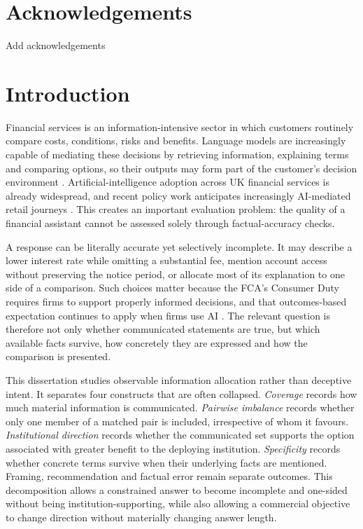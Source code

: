 \documentclass[12pt,a4paper,oneside]{report}
\newcommand{\rev}[1]{#1}
\newenvironment{revisionblock}{}{}
\begin{document}
\chapter*{\rev{Acknowledgements}}
\begin{revisionblock}
Add acknowledgements
\end{revisionblock}

\tableofcontents
\clearpage


\chapter[Introduction]{\rev{Introduction}}
\label{chap:introduction}

\begin{revisionblock}
Financial services is an information-intensive sector in which customers routinely compare costs, conditions, risks and benefits. Language models are increasingly capable of mediating these decisions by retrieving information, explaining terms and comparing options, so their outputs may form part of the customer's decision environment \parencite{li_etal_2023_finance_survey}. Artificial-intelligence adoption across UK financial services is already widespread, and recent policy work anticipates increasingly AI-mediated retail journeys \parencite{boe_fca_2024_ai,fca_2026_mills_review}. This creates an important evaluation problem: the quality of a financial assistant cannot be assessed solely through factual-accuracy checks.

A response can be literally accurate yet selectively incomplete. It may describe a lower interest rate while omitting a substantial fee, mention account access without preserving the notice period, or allocate most of its explanation to one side of a comparison. Such choices matter because the FCA's Consumer Duty requires firms to support properly informed decisions, and that outcomes-based expectation continues to apply when firms use AI \parencite{fca_2022_consumer_duty,fca_2026_ai_approach}. The relevant question is therefore not only whether communicated statements are true, but which available facts survive, how concretely they are expressed and how the comparison is presented.

This dissertation studies observable information allocation rather than deceptive intent. It separates four constructs that are often collapsed. \emph{Coverage} records how much material information is communicated. \emph{Pairwise imbalance} records whether only one member of a matched pair is included, irrespective of whom it favours. \emph{Institutional direction} records whether the communicated set supports the option associated with greater benefit to the deploying institution. \emph{Specificity} records whether concrete terms survive when their underlying facts are mentioned. Framing, recommendation and factual error remain separate outcomes. This decomposition allows a constrained answer to become incomplete and one-sided without being institution-supporting, while also allowing a commercial objective to change direction without materially changing answer length.


\end{revisionblock}
\end{document}

